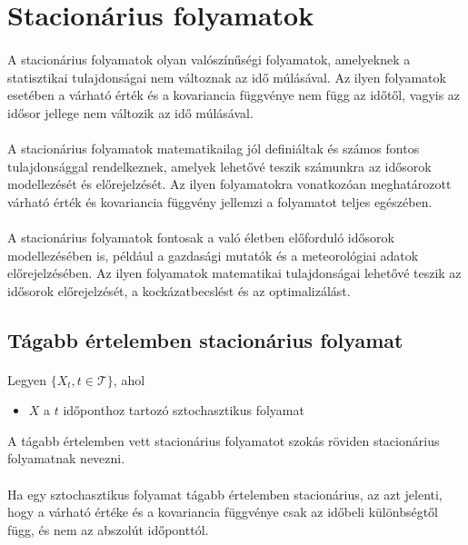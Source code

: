 \documentclass[11pt,a4paper]{article}
\begin{document}
		\section{Stacionárius folyamatok}
			\paragraph{}
				A stacionárius folyamatok olyan valószínűségi folyamatok, amelyeknek a statisztikai tulajdonságai nem változnak az idő múlásával. Az ilyen folyamatok esetében a várható érték és a kovariancia függvénye nem függ az időtől, vagyis az idősor jellege nem változik az idő múlásával.
			\paragraph{}
				A stacionárius folyamatok matematikailag jól definiáltak és számos fontos tulajdonsággal rendelkeznek, amelyek lehetővé teszik számunkra az idősorok modellezését és előrejelzését. Az ilyen folyamatokra vonatkozóan meghatározott várható érték és kovariancia függvény jellemzi a folyamatot teljes egészében. 
			\paragraph{}
				A stacionárius folyamatok fontosak a való életben előforduló idősorok modellezésében is, például a gazdasági mutatók és a meteorológiai adatok előrejelzésében. Az ilyen folyamatok matematikai tulajdonságai lehetővé teszik az idősorok előrejelzését, a kockázatbecslést és az optimalizálást. 
			\subsection{Tágabb értelemben stacionárius folyamat}
				\paragraph{}
					Legyen $\{X_t, t \in \mathcal{T}\}$, ahol
					\begin{itemize}
						\item $X$ a $t$ időponthoz tartozó sztochasztikus folyamat
					\end{itemize}
					A tágabb értelemben vett stacionárius folyamatot szokás röviden stacionárius folyamatnak nevezni.
				\paragraph{}
					Ha egy sztochasztikus folyamat tágabb értelemben stacionárius, az azt jelenti, hogy a várható értéke és a kovariancia függvénye csak az időbeli különbségtől függ, és nem az abszolút időponttól.
\end{document}
